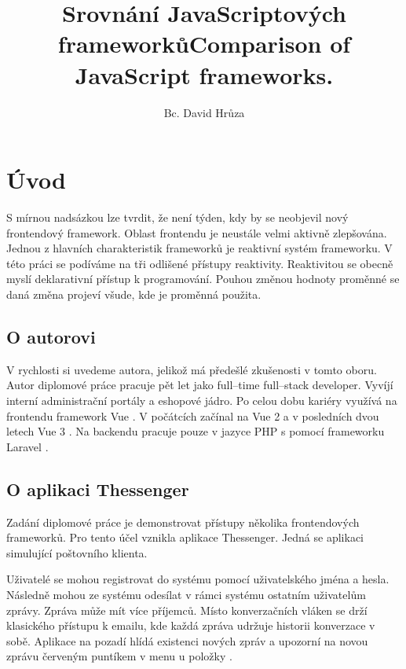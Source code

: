 \documentclass[
  master,
  program=ainf,
  tables=false,
  sourcecodes,
  glossaries,
  index
]{kidiplom}
\title{Srovnání JavaScriptových frameworků}
\title[english]{Comparison of JavaScript frameworks.}
\subtitle{}
\subtitle[english]{}
\author{Bc. David Hrůza}
\begin{document}
\maketitle


\section {Úvod}
S mírnou nadsázkou lze tvrdit, že není týden, kdy by se neobjevil nový frontendový
framework. Oblast frontendu je neustále velmi aktivně zlepšována. Jednou z hlavních
charakteristik frameworků je reaktivní systém frameworku. V této práci se podíváme 
na tři odlišené přístupy reaktivity. Reaktivitou se obecně myslí deklarativní přístup k 
programování. Pouhou změnou hodnoty proměnné se daná změna projeví všude, kde je 
proměnná použita.

\subsection{O autorovi}
V rychlosti si uvedeme autora, jelikož má předešlé zkušenosti v tomto oboru.
Autor diplomové práce pracuje pět let jako full--time full--stack developer.
Vyvíjí interní administrační portály a eshopové jádro. Po celou dobu kariéry
využívá na frontendu framework Vue \cite{vue}. V počátcích začínal na Vue 2 \cite{vue2} a v posledních
dvou letech Vue 3 \cite{vue}. Na backendu pracuje pouze v jazyce PHP \cite{php} s pomocí frameworku
Laravel \cite{laravel}. 

\subsection{O aplikaci Thessenger}
Zadání diplomové práce je demonstrovat přístupy několika frontendových
frameworků. Pro tento účel vznikla aplikace Thessenger. Jedná se aplikaci
simulující poštovního klienta.

Uživatelé se mohou registrovat do systému pomocí uživatelského jména a hesla.
Následně mohou ze systému odesílat v rámci systému ostatním uživatelům zprávy.
Zpráva může mít více příjemců. Místo konverzačních vláken se drží klasického
přístupu k emailu, kde každá zpráva udržuje historii konverzace v sobě.
Aplikace na pozadí hlídá existenci nových zpráv a upozorní na novou zprávu
červeným puntíkem v menu u položky .
\end{document}
